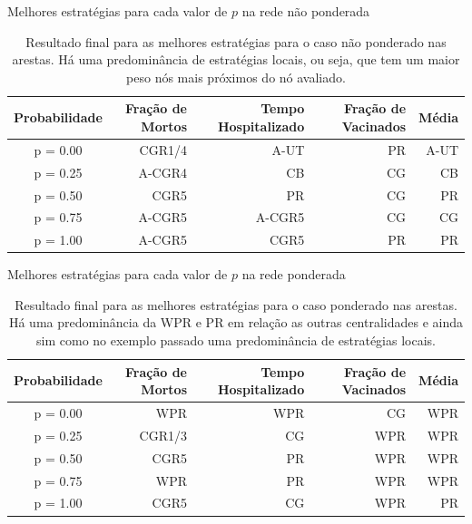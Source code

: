 \begin{table}[H]
    \caption{Melhores estratégias para cada valor de $p$ na rede não ponderada}
    \captionsetup{width=13.5cm}
    \begin{tabular}{crrrr}
    \toprule
    Probabilidade & Fração de Mortos & Tempo Hospitalizado & Fração de Vacinados & Média \\
    \midrule
    \midrule
    p = 0.00      & CGR1/4 & A-UT & PR & A-UT\\
    p = 0.25      & A-CGR4 & CB & CG & CB\\
    p = 0.50      & CGR5 & PR & CG & PR\\
    p = 0.75      & A-CGR5 & A-CGR5 & CG & CG\\
    p = 1.00      & A-CGR5 & CGR5 & PR & PR\\    
    \bottomrule
\end{tabular}
\caption*{Resultado final para as melhores estratégias para o caso não ponderado nas arestas. Há uma predominância de estratégias locais, ou seja, que tem um maior peso nós mais próximos do nó avaliado.}
\label{tabela:melhoresnponderado}
\end{table}

\begin{table}[H]
    \captionsetup{width=13.5cm}
    \caption{Melhores estratégias para cada valor de $p$ na rede ponderada}
    \begin{tabular}{crrrr}
    \toprule
    Probabilidade & Fração de Mortos & Tempo Hospitalizado & Fração de Vacinados & Média \\
    \midrule
    \midrule
    p = 0.00       & WPR & WPR & CG & WPR\\
    p = 0.25      & CGR1/3 & CG & WPR & WPR\\
    p = 0.50      & CGR5 & PR & WPR & WPR\\
    p = 0.75      & WPR & PR & WPR &  WPR\\
    p = 1.00      & CGR5 & CG & WPR &  PR\\    
    \bottomrule
\end{tabular}
\caption*{Resultado final para as melhores estratégias para o caso ponderado nas arestas. Há uma predominância da WPR e PR em relação as outras centralidades e ainda sim como no exemplo passado uma predominância de estratégias locais.}
\label{tabela:melhoresponderado}
\end{table}
